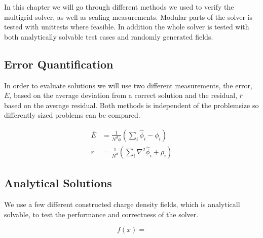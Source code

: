 In this chapter we will go through different methods we used to verify the multigrid
solver, as well as scaling measurements. Modular parts of the solver is tested with unittests
where feasible. In addition the whole solver is tested with both analytically solvable
test cases and randomly generated fields.

\subsection{Error Quantification}
	In order to evaluate solutions we will use two different measurements, the error, \(\bar{E}\), based
	on the average deviation from a correct solution and the residual, \(\bar{r}\) based on the average
	residual. Both methods is independent of the problemsize so differently sized problems can be compared.

	\begin{align}
		\bar{E} &= \frac{1}{N^d\bar{\phi}}\left( \sum_i{\hat{\phi}_i - \phi_i} \right)
		\\
		\bar{r} &= \frac{1}{N^d}\left( \sum_i{ \nabla^2 \hat{\phi}_i + \rho_i  }  \right)
	\end{align}

	\subsection{Analytical Solutions}
		We use a few different constructed charge density fields, which is analyticall solvable,
		to test the performance and correctness of the solver. 

			\begin{equation}
				f(x) =
			\end{equation}

%
%
%
%


